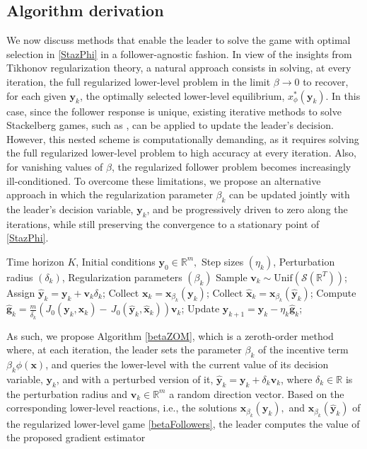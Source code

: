\documentclass[letterpaper, 10 pt, conference]{ieeeconf}
\newcommand{\real}{\mathbb{R}}
\newcommand\gbf{\mathbf{g}}
\newcommand\vbf{\mathbf{v}}
\newcommand\xbf{\mathbf{x}}
\newcommand\ybf{\mathbf{y}}
\begin{document}
\subsection{Algorithm derivation}
We now discuss methods that enable the leader to solve the game with optimal selection in \eqref{StazPhi} in a follower-agnostic fashion. In view of the insights from Tikhonov regularization theory, a natural approach consists in solving, at every iteration, the full regularized lower-level problem in the limit $\beta \rightarrow 0$ to recover, for each given $\ybf_k$, the optimally selected lower-level equilibrium, $x^*_\phi(\ybf_k)$. In this case, since the follower response is unique, existing iterative methods to solve Stackelberg games, such as \cite{grontas2024big, maheshwari2024follower}, can be applied to update the leader’s decision. 
However, this nested scheme is computationally demanding, as it requires solving the full regularized lower-level problem to high accuracy at every iteration. Also, for vanishing values of $\beta$, the regularized follower problem becomes increasingly ill-conditioned. To overcome these limitations, we propose an alternative approach in which the regularization parameter $\beta_k$ can be updated jointly with the leader’s decision variable, $\ybf_k$, and be progressively driven to zero along the iterations, while still preserving the convergence to a stationary point of \eqref{StazPhi}.
 \begin{algorithm}
\caption{Zeroth-order induced SE seeking}\label{betaZOM}
\begin{algorithmic}[1]
   \Require Time horizon $K$, Initial conditions $\ybf_0 \in \real^m,$ Step sizes $(\eta_k)$, Perturbation radius $(\delta_k)$, Regularization parameters $(\beta_k)$
   \State Sample $\vbf_k \sim \mathrm{Unif}(\mathcal{S}(\real^T))$;
   \State Assign $\hat{\ybf}_k=\ybf_k + \vbf_k \delta_k$;
   \State Collect $\xbf_k=\xbf_{\beta_k}(\ybf_k)$;
   \State Collect $\hat{\xbf}_k=\xbf_{\beta_k}(\hat{\ybf}_k)$;
   \State Compute $\hat{\gbf}_k=\frac{m}{\bar{\delta_k}}(J_0(\ybf_k, \xbf_k)- \,J_0(\hat{\ybf}_k, \hat{\xbf}_k))\vbf_k$;
   \State Update $\ybf_{k+1}=\ybf_k-\eta_k \hat{\gbf}_k$;
   \EndFor
\end{algorithmic}
\end{algorithm}
As such, we propose Algorithm \ref{betaZOM}, which is a zeroth-order method where, at each iteration, the leader sets the parameter $\beta_k$ of the incentive term $\beta_k \phi(\xbf)$, and queries the lower-level with the current value of its decision variable, $\ybf_k$, and with a perturbed version of it, $\hat{\ybf}_k=\ybf_k+\delta_k\vbf_k$, where $\delta_k \in \real$ is the perturbation radius and $\vbf_k \in \real^m$ a random direction vector. Based on the corresponding lower-level reactions, i.e., the solutions $\xbf_{\beta_k}(\ybf_k),$ and $ \xbf_{\beta_k}(\hat{\ybf}_k)$ of the regularized lower-level game \eqref{betaFollowers}, the leader computes the value of the proposed gradient estimator
\end{document}
